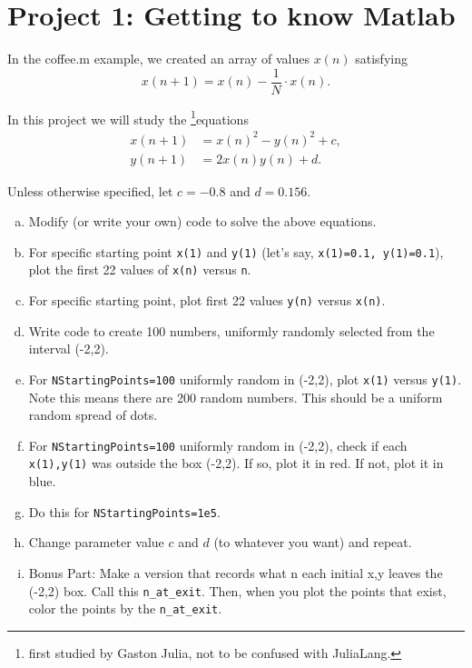 \documentclass{exam}
\begin{document}
\section*{Project 1: Getting to know Matlab}
 


In the coffee.m example, we created an array of values $x(n)$ satisfying
\begin{equation}
x(n+1) = x(n)-\frac{1}{N}\cdot x(n).
\end{equation}

In this project we will study the \footnote{first studied by Gaston Julia, not to be confused with JuliaLang.}{equations}
\begin{align}
x(n+1) &= x(n)^2 - y(n)^2 + c,\\
y(n+1) &= 2x(n) y(n) + d.
\end{align} 

Unless otherwise specified, let $c= -0.8$ and $d =0.156$.


\begin{enumerate}[a.]
\item Modify (or write your own) code to solve the above equations.
\item For specific starting point \verb|x(1)| and \verb|y(1)| (let's say, \verb|x(1)=0.1, y(1)=0.1|), plot the first 22 values of \verb|x(n)| versus \verb|n|.
\item For specific starting point, plot first 22 values \verb|y(n)| versus \verb|x(n)|.
\item Write code to create 100 numbers, uniformly randomly selected from the interval (-2,2). 
\item For \verb|NStartingPoints=100| uniformly random in (-2,2),  plot \verb|x(1)| versus \verb|y(1)|. Note this means there are 200 random numbers. This should be a uniform random spread of dots. 
\item For \verb|NStartingPoints=100| uniformly random in (-2,2), check if each \verb|x(1),y(1)| was outside the box (-2,2). If so, plot it in red. If not, plot it in blue. 
\item Do this for \verb|NStartingPoints=1e5|.  
\item Change parameter value $c$ and $d$ (to whatever you want) and repeat.
\item Bonus Part: Make a version that records what n each initial x,y leaves the (-2,2) box. Call this \verb|n_at_exit|. Then, when you plot the points that exist, color the points by the \verb|n_at_exit|.
\end{enumerate}




\end{document}
